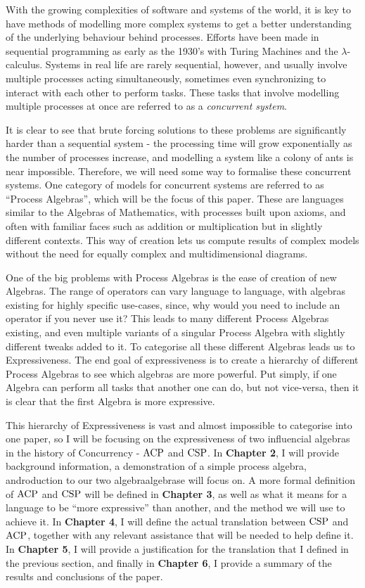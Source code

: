 \documentclass[../hons_project.tex]{subfiles}
\begin{document}
With the growing complexities of software and systems of the world, it is key to have methods of modelling more complex systems to get a better understanding of the underlying behaviour behind processes. Efforts have been made in sequential programming as early as the 1930's with Turing Machines and the $\lambda$-calculus. Systems in real life are rarely sequential, however, and usually involve multiple processes acting simultaneously, sometimes even synchronizing to interact with each other to perform tasks. These tasks that involve modelling multiple processes at once are referred to as a \textit{ concurrent system}. 

It is clear to see that brute forcing solutions to these problems are significantly harder than a sequential system - the processing time will grow exponentially as the number of processes increase, and modelling a system like a colony of ants is near impossible. Therefore, we will need some way to formalise these concurrent systems. One category of models for concurrent systems are referred to as ``Process Algebras'', which will be the focus of this paper. These are languages similar to the Algebras of Mathematics, with processes built upon axioms, and often with familiar faces such as addition or multiplication but in slightly different contexts. This way of creation lets us compute results of complex models without the need for equally complex and multidimensional diagrams.

One of the big problems with Process Algebras is the ease of creation of new Algebras. The range of operators can vary language to language, with algebras existing for highly specific use-cases, since, why would you need to include an operator if you never use it? This leads to many different Process Algebras existing, and even multiple variants of a singular Process Algebra with slightly different tweaks added to it. To categorise all these different Algebras leads us to Expressiveness. The end goal of expressiveness is to create a hierarchy of different Process Algebras to see which algebras are more powerful. Put simply, if one Algebra can perform all tasks that another one can do, but not vice-versa, then it is clear that the first Algebra is more expressive.

This hierarchy of Expressiveness is vast and almost impossible to categorise into one paper, so I will be focusing on the expressiveness of two influencial algebras in the history of Concurrency - $\mathrm{ACP}$ and $\mathrm{CSP}$. In \textbf{Chapter 2}, I will provide background information, a demonstration of a simple process algebra, androduction to our two algebraalgebrase will focus on. A more formal definition of $\mathrm{ACP}$ and $\mathrm{CSP}$ will be defined in \textbf{Chapter 3}, as well as what it means for a language to be ``more expressive'' than another, and the method we will use to achieve it. In \textbf{Chapter 4}, I will define the actual translation between $\mathrm{CSP}$ and $\mathrm{ACP}$, together with any relevant assistance that will be needed to help define it. In \textbf{Chapter 5}, I will provide a justification for the translation that I defined in the previous section, and finally in \textbf{Chapter 6}, I provide a summary of the results and conclusions of the paper.
\end{document}
